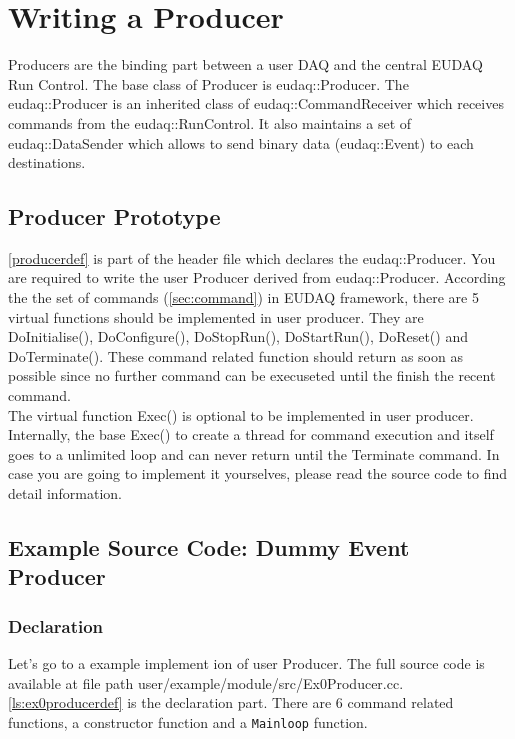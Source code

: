 \section{Writing a Producer}\label{sec:ProducerWriting}
Producers are the binding part between a user DAQ and the central EUDAQ Run Control. The base class of Producer is eudaq::Producer. The eudaq::Producer is an inherited class of eudaq::CommandReceiver which receives commands from the eudaq::RunControl. It also maintains a set of eudaq::DataSender which allows to send binary data (eudaq::Event) to each destinations.\\

\subsection{Producer Prototype}\label{sec:Producer_hh}

\autoref{producerdef} is part of the header file which declares the eudaq::Producer. You are required to write the user Producer derived from eudaq::Producer. According the the set of commands (\autoref{sec:command}) in EUDAQ framework, there are 5 virtual functions should be implemented in user producer. They are DoInitialise(), DoConfigure(), DoStopRun(), DoStartRun(), DoReset() and DoTerminate(). These command related function should return as soon as possible since no further command can be execuseted until the finish the recent command. \\



The virtual function Exec() is optional to be implemented in user producer. Internally, the base Exec() to create a thread for command execution and itself goes to a unlimited loop and can never return until the Terminate command. In case you are going to implement it yourselves, please read the source code to find detail information.

\subsection{Example Source Code: Dummy Event Producer}\label{sec:Ex0Producer_cc}
\subsubsection{Declaration}
Let's go to a example implement ion of user Producer. The full source code is available at file path user/example/module/src/Ex0Producer.cc.  \autoref{ls:ex0producerdef} is the declaration part. There are 6 command related functions, a constructor function and a \texttt{Mainloop} function. \\

